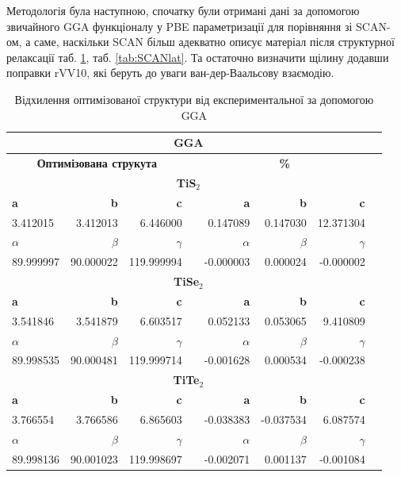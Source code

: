 Методологія була наступною, спочатку були отримані дані за допомогою звичайного GGA функціоналу у PBE параметризації для порівняння зі SCAN-ом, а саме, наскільки SCAN більш адекватно описує матеріал після структурної релаксації таб. \ref{tab:GGAlat}, таб. \ref{tab:SCANlat}. Та остаточно визначити щілину додавши поправки rVV10, які беруть до уваги ван-дер-Ваальсову взаємодію.

\begin{table}[!htp]\centering
\scriptsize
\begin{tabular}{lrrrrrrr}\toprule
\multicolumn{7}{c}{\textbf{GGA}} \\\midrule
\multicolumn{3}{c}{\textbf{Оптимізована струкута}} & &\multicolumn{3}{c}{\textbf{\%}} \\
\multicolumn{7}{c}{\textbf{TiS$_2$}} \\
\textbf{a} &\textbf{b} &\textbf{c} & &\textbf{a} &\textbf{b} &\textbf{c} \\
3.412015 &3.412013 &6.446000 & &0.147089 &0.147030 &12.371304 \\
\textbf{$\alpha$} &\textbf{$\beta$} &\textbf{$\gamma$} & &\textbf{$\alpha$} &\textbf{$\beta$} &\textbf{$\gamma$} \\
89.999997 &90.000022 &119.999994 & &-0.000003 &0.000024 &-0.000002 \\
\multicolumn{7}{c}{\textbf{TiSe$_2$}} \\
\textbf{a} &\textbf{b} &\textbf{c} & &\textbf{a} &\textbf{b} &\textbf{c} \\
3.541846 &3.541879 &6.603517 & &0.052133 &0.053065 &9.410809 \\
\textbf{$\alpha$} &\textbf{$\beta$} &\textbf{$\gamma$} & &\textbf{$\alpha$} &\textbf{$\beta$} &\textbf{$\gamma$} \\
89.998535 &90.000481 &119.999714 & &-0.001628 &0.000534 &-0.000238 \\
\multicolumn{7}{c}{\textbf{TiTe$_2$}} \\
\textbf{a} &\textbf{b} &\textbf{c} & &\textbf{a} &\textbf{b} &\textbf{c} \\
3.766554 &3.766586 &6.865603 & &-0.038383 &-0.037534 &6.087574 \\
\textbf{$\alpha$} &\textbf{$\beta$} &\textbf{$\gamma$} & &\textbf{$\alpha$} &\textbf{$\beta$} &\textbf{$\gamma$} \\
89.998136 &90.001023 &119.998697 & &-0.002071 &0.001137 &-0.001084 \\
\bottomrule
\end{tabular}
\caption{Відхилення оптимізованої структури від експериментальної за допомогою GGA}\label{tab:GGAlat}
\end{table}


